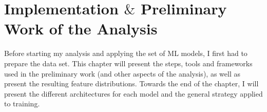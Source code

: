 \chapter{Implementation $\&$ Preliminary Work of the Analysis}\label{chap:Implementation}
Before starting my analysis and applying the set of \ac{ML} models, I first had to prepare the data set. This chapter 
will present the steps, tools and frameworks used in the preliminary work (and other aspects of the analysis), as well as present the 
resulting feature distributions. Towards the end of the chapter, I will present the different architectures for each model and the general 
strategy applied to training.

